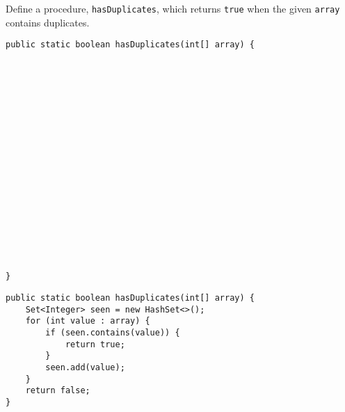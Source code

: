 \question Define a procedure, \texttt{hasDuplicates}, which returns \texttt{true} when the given \texttt{array} contains duplicates.

\ifprintanswers\else
\begin{lstlisting}
public static boolean hasDuplicates(int[] array) {



















}
\end{lstlisting}
\fi

\begin{solution}
\begin{lstlisting}
public static boolean hasDuplicates(int[] array) {
    Set<Integer> seen = new HashSet<>();
    for (int value : array) {
        if (seen.contains(value)) {
            return true;
        }
        seen.add(value);
    }
    return false;
}
\end{lstlisting}
\end{solution}